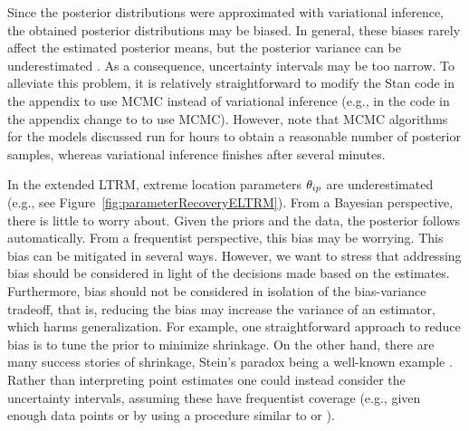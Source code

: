 \documentclass[a4paper,usenames,dvipsnames]{article}
\newenvironment{revision}{\color{black}}{\color{black}}
\begin{document}
Since the posterior distributions were approximated with variational inference, the obtained posterior distributions may be biased. In general, these biases rarely affect the estimated posterior means, but the posterior variance can be underestimated \cite{blei2017variational}. As a consequence, uncertainty intervals may be too narrow. To alleviate this problem, it is relatively straightforward to modify the Stan code in the appendix to use MCMC instead of variational inference (e.g., in the code in the appendix change  to  to use MCMC). However, note that MCMC algorithms for the models discussed run for hours to obtain a reasonable number of posterior samples, whereas variational inference finishes after several minutes.

\protect\begin{revision}
In the extended LTRM, extreme location parameters $\theta_{ip}$ are underestimated (e.g., see Figure~\ref{fig:parameterRecoveryELTRM}).
From a Bayesian perspective, there is little to worry about. Given the priors and the data, the posterior follows automatically.
From a frequentist perspective, this bias may be worrying.
This bias can be mitigated in several ways.
However, we want to stress that addressing bias should be considered in light of the decisions made based on the estimates.
Furthermore, bias should not be considered in isolation of the bias-variance tradeoff, that is, reducing the bias may increase the variance of an estimator, which harms generalization. 
For example, one straightforward approach to reduce bias is to tune the prior to minimize shrinkage. On the other hand, there are many success stories of shrinkage, Stein’s paradox being a well-known example \cite{EfronMorris1977}.
Rather than interpreting point estimates one could instead consider the uncertainty intervals, assuming these have frequentist coverage (e.g., given enough data points or by using a procedure similar to  or ).
\protect\end{revision}
\end{document}

